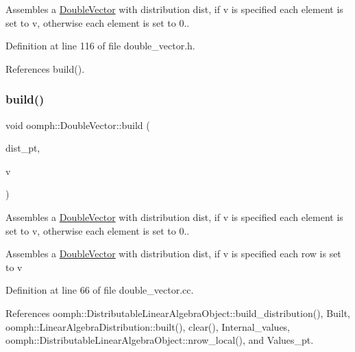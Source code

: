 Assembles a \hyperlink{classoomph_1_1DoubleVector}{Double\+Vector} with distribution dist, if v is specified each element is set to v, otherwise each element is set to 0.. 



Definition at line 116 of file double\+\_\+vector.\+h.



References build().

\mbox{\label{classoomph_1_1DoubleVector_a84d5a0b2335fb1af865c84f8f25421e9}} 
\subsubsection{\texorpdfstring{build()}{build()}\hspace{0.1cm}{\footnotesize\ttfamily [3/5]}}
{\footnotesize\ttfamily void oomph\+::\+Double\+Vector\+::build (\begin{DoxyParamCaption}\item[{const \hyperlink{classoomph_1_1LinearAlgebraDistribution}{Linear\+Algebra\+Distribution} $\ast$const \&}]{dist\+\_\+pt,  }\item[{const double \&}]{v }\end{DoxyParamCaption})}



Assembles a \hyperlink{classoomph_1_1DoubleVector}{Double\+Vector} with distribution dist, if v is specified each element is set to v, otherwise each element is set to 0.. 

Assembles a \hyperlink{classoomph_1_1DoubleVector}{Double\+Vector} with distribution dist, if v is specified each row is set to v 

Definition at line 66 of file double\+\_\+vector.\+cc.



References oomph\+::\+Distributable\+Linear\+Algebra\+Object\+::build\+\_\+distribution(), Built, oomph\+::\+Linear\+Algebra\+Distribution\+::built(), clear(), Internal\+\_\+values, oomph\+::\+Distributable\+Linear\+Algebra\+Object\+::nrow\+\_\+local(), and Values\+\_\+pt.

\mbox{\label{classoomph_1_1DoubleVector_a73332fc4a200a32d7281ceb548375d8a}} 

